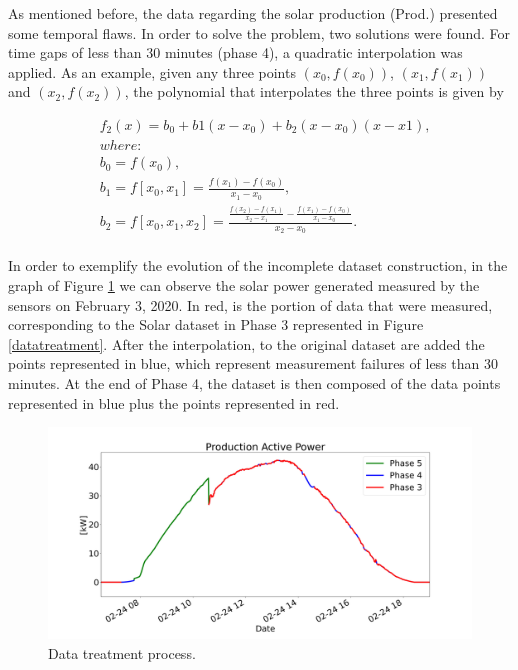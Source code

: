 As mentioned before, the data regarding the solar production (Prod.) presented some temporal flaws. In order to solve the problem, two solutions were found. For time gaps of less than 30 minutes (phase 4), a quadratic interpolation was applied. As an example, given any three points $(x_0, f(x_0))$, $(x_1, f(x_1))$ and $(x_2, f(x_2))$, the polynomial that interpolates the three points is given by

\begin{equation}
\begin{split}
     & f_2(x)=b_0+b1(x-x_0)+b_2(x-x_0)(x-x1),\\
     & where:\\
     & b_0=f(x_0),\\
     & b_1=f[x_0,x_1]=\frac{f(x_1)-f(x_0)}{x_1-x_0},\\
     & b_2=f[x_0,x_1,x_2]=\frac{\frac{f(x_2)-f(x_1)}{x_2-x_1}-\frac{f(x_1)-f(x_0)}{x_1-x_0}}{x_2-x_0}.\\
\end{split}
\label{poly}
\end{equation}

In order to exemplify the evolution of the incomplete dataset construction, in the graph of Figure \ref{int0} we can observe the solar power generated measured by the sensors on February 3, 2020. In red, is the portion of data that were measured, corresponding to the Solar dataset in Phase 3 represented in Figure \ref{datatreatment}. After the interpolation, to the original dataset are added the points represented in blue, which represent measurement failures of less than 30 minutes. At the end of Phase 4, the dataset is then composed of the data points represented in blue plus the points represented in red.



\begin{figure}[h!]
    \centering
    \begin{center}
    \includegraphics[width=1\textwidth]{Images/int0.png}
    \caption{Data treatment process.}
    \label{int0}
    \end{center}
\end{figure}





